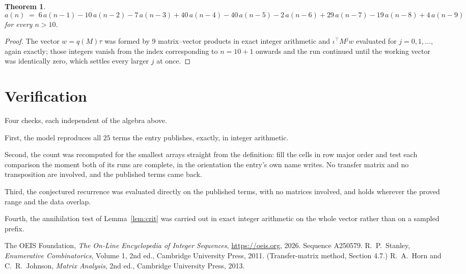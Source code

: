 \documentclass[11pt,a4paper]{article}
\theoremstyle{plain}
\newtheorem{theorem}{Theorem}
\theoremstyle{definition}
\begin{document}
\begin{theorem}
\[
a(n)\;=\;6\,a(n-1) - 10\,a(n-2) - 7\,a(n-3) + 40\,a(n-4) - 40\,a(n-5) - 2\,a(n-6) + 29\,a(n-7) - 19\,a(n-8) + 4\,a(n-9)
\]
for every $n>10$.
\end{theorem}

\begin{proof}
The vector $w=q(M)\tau$ was formed by $9$ matrix--vector products in exact integer
arithmetic and $\iota^{\!\top}M^{j}w$ evaluated for $j=0,1,\dots$, again exactly; those
integers vanish from the index corresponding to $n=10+1$ onwards and the run continued
until the working vector was identically zero, which settles every larger $j$ at once.
\end{proof}

\section{Verification}

Four checks, each independent of the algebra above.

First, the model reproduces all $25$ terms the entry publishes, exactly, in integer
arithmetic.

Second, the count was recomputed for the smallest arrays straight from the definition: fill the
cells in row major order and test each comparison the moment both of its runs are complete,
in the orientation the entry's own name writes. No transfer matrix and no transposition are
involved, and the published terms came back.

Third, the conjectured recurrence was evaluated directly on the published terms, with no
matrices involved, and holds wherever the proved range and the data overlap.

Fourth, the annihilation test of Lemma~\ref{lem:crit} was carried out in exact integer
arithmetic on the whole vector rather than on a sampled prefix.

\begin{thebibliography}{9}
 The OEIS Foundation, \emph{The On-Line Encyclopedia of Integer
Sequences}, \url{https://oeis.org}, 2026. Sequence A250579.
 R.~P.~Stanley, \emph{Enumerative Combinatorics}, Volume 1, 2nd ed.,
Cambridge University Press, 2011. (Transfer-matrix method, Section 4.7.)
 R.~A.~Horn and C.~R.~Johnson, \emph{Matrix Analysis}, 2nd ed., Cambridge
University Press, 2013.
\end{thebibliography}
\end{document}
